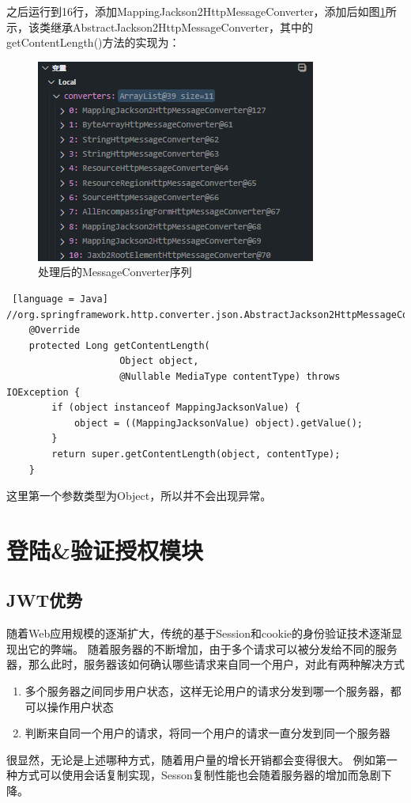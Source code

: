 之后运行到16行，添加MappingJackson2HttpMessageConverter，添加后如图\ref{MessageConverter-list-after-add}所示，该类继承AbstractJackson2HttpMessageConverter，其中的getContentLength()方法的实现为：

\begin{figure}[H]
  \centering
  \includegraphics[scale = 0.8]{out/figure/统一返回对象/WebMvcConfiguration-MessageConverter-debug-after-add.png}
  \caption{\song\wuhao 处理后的MessageConverter序列}
  \label{MessageConverter-list-after-add}
\end{figure}

\begin{lstlisting} [language = Java]
//org.springframework.http.converter.json.AbstractJackson2HttpMessageConverter;
	@Override
	protected Long getContentLength(
                    Object object, 
                    @Nullable MediaType contentType) throws IOException {
		if (object instanceof MappingJacksonValue) {
			object = ((MappingJacksonValue) object).getValue();
		}
		return super.getContentLength(object, contentType);
	}
\end{lstlisting}

这里第一个参数类型为Object，所以并不会出现异常。

\section{登陆\&验证授权模块}

\subsection{JWT优势}

随着Web应用规模的逐渐扩大，传统的基于Session和cookie的身份验证技术逐渐显现出它的弊端。
随着服务器的不断增加，由于多个请求可以被分发给不同的服务器，那么此时，服务器该如何确认哪些请求来自同一个用户，对此有两种解决方式
\begin{enumerate}
  \item 多个服务器之间同步用户状态，这样无论用户的请求分发到哪一个服务器，都可以操作用户状态
  \item 判断来自同一个用户的请求，将同一个用户的请求一直分发到同一个服务器
\end{enumerate}
很显然，无论是上述哪种方式，随着用户量的增长开销都会变得很大。
例如第一种方式可以使用会话复制实现，Sesson复制性能也会随着服务器的增加而急剧下降。\cite{.2019h}

